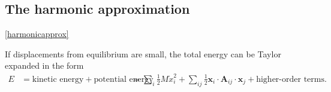 





\subsection{The harmonic approximation} \ref{harmonicapprox}

If displacements from equilibrium are small, the total energy can be Taylor expanded in the form 
\begin{align} \label{taylorexpansion}
E&=\textrm{kinetic energy}+\textrm{potential energy}
&=\sum_i\frac{1}{2}M\dot{x}_i^2+\sum_{ij}\frac{1}{2}\textbf{x}_i\cdot\textbf{A}_{ij}\cdot\textbf{x}_j+\textrm{higher-order terms}.
\end{align}

